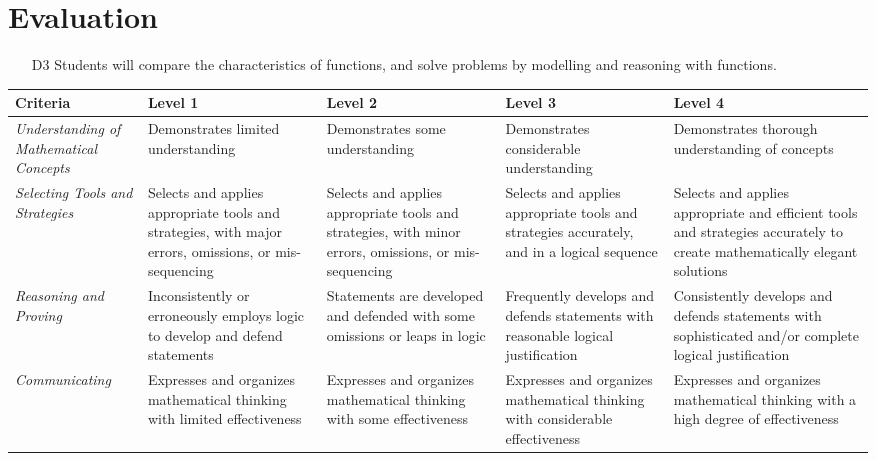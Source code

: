 \documentclass[12pt]{book}
\begin{document}
\section*{Evaluation}

\begin{itemize}
\item[D3]	Students will compare the characteristics of functions, and solve problems by modelling and reasoning with functions.
\end{itemize}

\begin{tabular}{| C{2in} | C{1in} | C{1in} | C{1in} | C{1in} |}
\hline
\textbf{Criteria} & \textbf{Level 1} & \textbf{Level 2} & \textbf{Level 3} & \textbf{Level 4} \\
\hline
\emph{Understanding of Mathematical Concepts} & Demonstrates limited understanding & Demonstrates some understanding & Demonstrates considerable understanding & Demonstrates thorough understanding of concepts \\
\hline
\emph{Selecting Tools and Strategies} & Selects and applies appropriate tools and strategies, with major errors, omissions, or mis-sequencing & Selects and applies appropriate tools and strategies, with minor errors, omissions, or mis-sequencing & Selects and applies appropriate tools and strategies accurately, and in a logical sequence & Selects and applies appropriate and efficient tools and strategies accurately to create mathematically elegant solutions \\
\hline
\emph{Reasoning and Proving} & Inconsistently or erroneously employs logic to develop and defend statements & Statements are developed and defended with some omissions or leaps in logic & Frequently develops and defends statements with reasonable logical justification & Consistently develops and defends statements with sophisticated and/or complete logical justification \\
\hline
\emph{Communicating} & Expresses and organizes mathematical thinking with limited effectiveness & Expresses and organizes mathematical thinking with some effectiveness & Expresses and organizes mathematical thinking with considerable effectiveness & Expresses and organizes mathematical thinking with a high degree of effectiveness \\
\hline
\end{tabular}

\pagebreak
\end{document}

